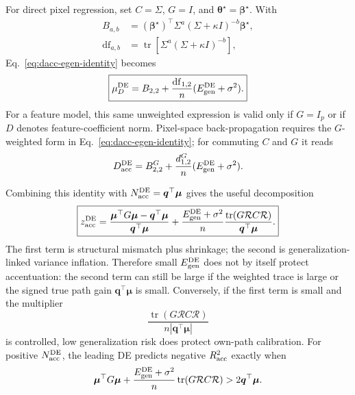 \documentclass[11pt]{article}
\newcommand{\tr}{\operatorname{tr}}
\newcommand{\bstar}{\bm\beta^{\star}}
\newcommand{\tstar}{\bm\theta^{\star}}
\begin{document}
For direct pixel regression, set $C=\Sigma$, $G=I$, and
$\tstar=\bstar$.  With
\begin{align}
  B_{a,b}
    &=(\bstar)^{\top}\Sigma^a(\Sigma+\kappa I)^{-b}\bstar,\\
  \mathrm{df}_{a,b}
    &=\tr[\Sigma^a(\Sigma+\kappa I)^{-b}],
\end{align}
Eq.~\eqref{eq:dacc-egen-identity} becomes
\begin{equation}
  \boxed{
  \mu_D^{\rm DE}
    =B_{2,2}
     +\frac{\mathrm{df}_{1,2}}{n}
       (E_{\rm gen}^{\rm DE}+\sigma^2).}
  \label{eq:pixel-d-egen-identity}
\end{equation}
For a feature model, this same unweighted expression is valid only if
$G=I_p$ or if $D$ denotes feature-coefficient norm.  Pixel-space
back-propagation requires the $G$-weighted form in
Eq.~\eqref{eq:dacc-egen-identity}; for commuting $C$ and $G$ it reads
\begin{equation}
  D_{\rm acc}^{\rm DE}
    =B_{2,2}^{G}
     +\frac{d_{1,2}^{G}}{n}
       (E_{\rm gen}^{\rm DE}+\sigma^2).
  \label{eq:aligned-feature-d-egen-identity}
\end{equation}

Combining this identity with $N_{\rm acc}^{\rm DE}=\bm q^{\top}\bm\mu$
gives the useful decomposition
\begin{equation}
  \boxed{
  z_{\rm acc}^{\rm DE}
  =\frac{\bm\mu^{\top}G\bm\mu-\bm q^{\top}\bm\mu}
         {\bm q^{\top}\bm\mu}
   +\frac{E_{\rm gen}^{\rm DE}+\sigma^2}{n}
    \frac{\tr(G\mathcal R C\mathcal R)}
         {\bm q^{\top}\bm\mu}.}
  \label{eq:z-egen-decomposition}
\end{equation}
The first term is structural mismatch plus shrinkage; the second is
generalization-linked variance inflation.  Therefore small
$E_{\rm gen}^{\rm DE}$ does not by itself protect accentuation: the second
term can still be large if the weighted trace is large or the signed true
path gain $\bm q^{\top}\bm\mu$ is small.  Conversely, if the first term is
small and the multiplier
\begin{equation}
  \frac{\tr(G\mathcal R C\mathcal R)}
       {n|\bm q^{\top}\bm\mu|}
\end{equation}
is controlled, low generalization risk does protect own-path calibration.
For positive $N_{\rm acc}^{\rm DE}$, the leading DE predicts negative
$R^2_{\rm acc}$ exactly when
\begin{equation}
  \bm\mu^{\top}G\bm\mu
  +\frac{E_{\rm gen}^{\rm DE}+\sigma^2}{n}
       \tr(G\mathcal R C\mathcal R)
  >2\bm q^{\top}\bm\mu.
  \label{eq:negative-r2-threshold-egen}
\end{equation}
\end{document}
